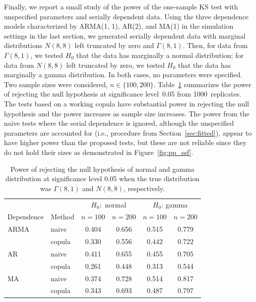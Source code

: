 \documentclass[12pt, letterpaper]{article}
\begin{document}
Finally, we report a small study of the power of the one-sample KS test with
unspecified parameters and serially dependent data. Using the three dependence
models characterized by ARMA(1, 1), AR(2), and MA(1) in the simulation settings
in the last section, we generated serially
dependent data with marginal distributions $N(8, 8)$ left truncated by zero and
$\Gamma(8, 1)$. 
Then, for data from $\Gamma(8, 1)$, we tested $H_0$ that the
data has marginally a normal distribution; for data from $N(8, 8)$ left
truncated by zero, we tested $H_0$ that the data has marginally a gamma
distribution.  In both cases, no parameters were specified. Two sample sizes
were considered, $n \in \{100, 200\}$. Table~\ref{tab:power} summarizes the
power of rejecting the null hypothesis at significance level~0.05 from
1000~replicates. The tests
based on a working copula have substantial power in rejecting the null
hypothesis and the power increases as sample size increases. The power from the
naive tests where the serial dependence is ignored, although the unspecified
parameters are accounted for (i.e., procedure from 
Section~\ref{sec:fitted}), appear to 
have higher power than the proposed tests, but these are not reliable since they 
do not hold their sizes as demonstrated in Figure~\ref{fig:pp_ssf}.

\begin{table}[tbp]
  \caption{Power of rejecting the null hypothesis of normal and gamma
    distribution at significance level 0.05 when the true distribution was
    $\Gamma(8, 1)$ and $N(8, 8)$, respectively. }
  \label{tab:power}
\centering
\begin{tabular}{ll cccc}
  \toprule
  &  & \multicolumn{2}{c}{$H_0:$ normal} &
  \multicolumn{2}{c}{$H_0$: gamma}\\
  \cmidrule(lr){3-4}\cmidrule(lr){5-6}
  Dependence & Method & $n = 100$ & $n = 200$ & $n = 100$ & $n = 200$\\
  \midrule
ARMA & naive & 0.404 & 0.656 & 0.515 & 0.779 \\ 
 & copula & 0.330 & 0.556 & 0.442 & 0.722 \\ 
AR & naive & 0.411 & 0.655 & 0.455 & 0.705 \\ 
& copula & 0.261 & 0.448 & 0.313 & 0.544 \\ 
MA & naive & 0.374 & 0.728 & 0.514 & 0.817 \\ 
& copula & 0.343 & 0.693 & 0.487 & 0.797 \\ 
   \bottomrule
\end{tabular}
\end{table}
\end{document}
